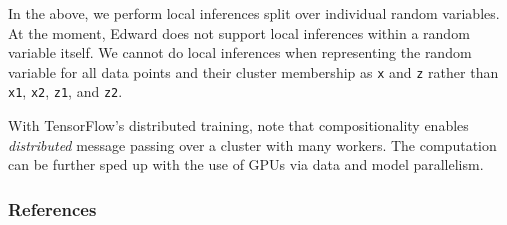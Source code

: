 In the above, we perform local inferences split over individual random
variables. At the moment, Edward does not support local inferences
within a random variable itself. We cannot do local inferences when
representing the random variable for all data points and their cluster
membership as \texttt{x} and \texttt{z} rather than \texttt{x1},
\texttt{x2}, \texttt{z1}, and \texttt{z2}.

With TensorFlow's distributed training, note that compositionality
enables \emph{distributed} message passing over a cluster with many
workers. The computation can be further sped up with the use of GPUs
via data and model parallelism.

\subsubsection{References}\label{references}
